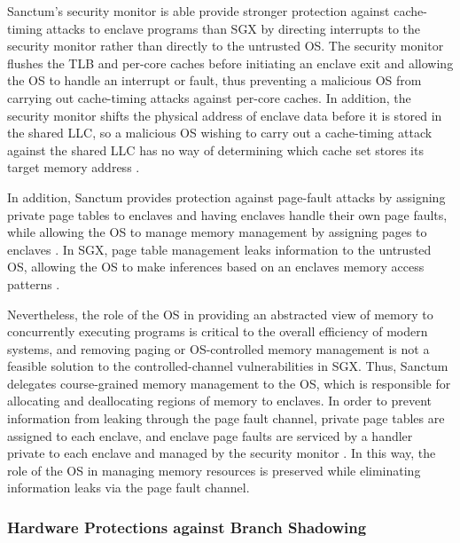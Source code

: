 Sanctum's security monitor is able provide stronger protection against cache-timing attacks to enclave programs than SGX by directing interrupts to the security monitor rather than directly to the untrusted OS. The security monitor flushes the TLB and per-core caches before initiating an enclave exit and allowing the OS to handle an interrupt or fault, thus preventing a malicious OS from carrying out cache-timing attacks against per-core caches. In addition, the security monitor shifts the physical address of enclave data before it is stored in the shared LLC, so a malicious OS wishing to carry out a cache-timing attack against the shared LLC has no way of determining which cache set stores its target memory address \cite{costan_sanctum:_2016, costan_sanctum:_2015}.

In addition, Sanctum provides protection against page-fault attacks by assigning private page tables to enclaves and having enclaves handle their own page faults, while allowing the OS to manage memory management by assigning pages to enclaves \cite{costan_sanctum:_2016, costan_sanctum:_2015}. In SGX, page table management leaks information to the untrusted OS, allowing the OS to make inferences based on an enclaves memory access patterns \cite{costan_sanctum:_2016, costan_sanctum:_2015, costan_intel_2016}. 

Nevertheless, the role of the OS in providing an abstracted view of memory to concurrently executing programs is critical to the overall efficiency of modern systems, and removing paging or OS-controlled memory management is not a feasible solution to the controlled-channel vulnerabilities in SGX. Thus, Sanctum delegates course-grained memory management to the OS, which is responsible for allocating and deallocating regions of memory to enclaves. In order to prevent information from leaking through the page fault channel, private page tables are assigned to each enclave, and enclave page faults are serviced by a handler private to each enclave and managed by the security monitor \cite{costan_sanctum:_2016, costan_sanctum:_2015}. In this way, the role of the OS in managing memory resources is preserved while eliminating information leaks via the page fault channel.

\subsubsection{Hardware Protections against Branch Shadowing}

